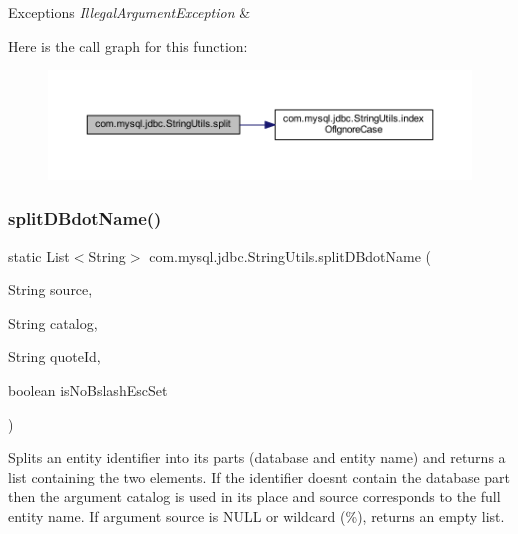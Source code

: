 \begin{DoxyExceptions}{Exceptions}
{\em Illegal\+Argument\+Exception} & \\
\hline
\end{DoxyExceptions}
Here is the call graph for this function\+:
\nopagebreak
\begin{figure}[H]
\begin{center}
\leavevmode
\includegraphics[width=350pt]{classcom_1_1mysql_1_1jdbc_1_1_string_utils_adf390b3d52e630b26eb77d692e4ed624_cgraph}
\end{center}
\end{figure}
\mbox{\label{classcom_1_1mysql_1_1jdbc_1_1_string_utils_a7fe39164a1f79c6421f46509e672693a}} 
\subsubsection{\texorpdfstring{split\+D\+Bdot\+Name()}{splitDBdotName()}}
{\footnotesize\ttfamily static List$<$String$>$ com.\+mysql.\+jdbc.\+String\+Utils.\+split\+D\+Bdot\+Name (\begin{DoxyParamCaption}\item[{String}]{source,  }\item[{String}]{catalog,  }\item[{String}]{quote\+Id,  }\item[{boolean}]{is\+No\+Bslash\+Esc\+Set }\end{DoxyParamCaption})\hspace{0.3cm}{\ttfamily [static]}}

Splits an entity identifier into its parts (database and entity name) and returns a list containing the two elements. If the identifier doesn\textquotesingle{}t contain the database part then the argument {\ttfamily catalog} is used in its place and {\ttfamily source} corresponds to the full entity name. If argument {\ttfamily source} is N\+U\+LL or wildcard (\%), returns an empty list.


